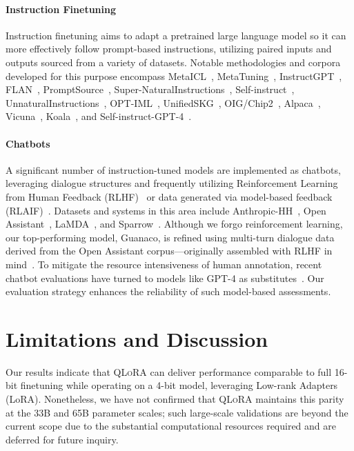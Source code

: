 \paragraph{Instruction Finetuning} Instruction finetuning aims to adapt a pretrained large language model so it can more effectively follow prompt-based instructions, utilizing paired inputs and outputs sourced from a variety of datasets. Notable methodologies and corpora developed for this purpose encompass MetaICL~\citep{min2021metaicl}, MetaTuning~\citep{zhong2021adapting}, InstructGPT~\citep{ouyang2022training}, FLAN~\citep{wei2021finetuned,chung2022scaling}, PromptSource~\citep{bach2022promptsource}, Super-NaturalInstructions~\citep{wang2022super,sanh2021multitask}, Self-instruct~\citep{wang2022self}, UnnaturalInstructions~\citep{honovich2022unnatural}, OPT-IML~\citep{iyer2022opt}, UnifiedSKG~\citep{xie2022unifiedskg}, OIG/Chip2~\citep{laion2023}, Alpaca~\citep{alpaca}, Vicuna~\citep{vicuna2023}, Koala~\citep{koala_blogpost_2023}, and Self-instruct-GPT-4~\citep{peng2023instruction}.

\paragraph{Chatbots} A significant number of instruction-tuned models are implemented as chatbots, leveraging dialogue structures and frequently utilizing Reinforcement Learning from Human Feedback (RLHF)~\citep{christiano2017deep} or data generated via model-based feedback (RLAIF)~\citep{bai2022constitutional}. Datasets and systems in this area include Anthropic-HH~\citep{askell2021general,bai2022training}, Open Assistant~\citep{kopf2023openassistant}, LaMDA~\citep{thoppilan2022lamda}, and Sparrow~\citep{glaese2022improving}. Although we forgo reinforcement learning, our top-performing model, Guanaco, is refined using multi-turn dialogue data derived from the Open Assistant corpus—originally assembled with RLHF in mind~\citep{kopf2023openassistant}. To mitigate the resource intensiveness of human annotation, recent chatbot evaluations have turned to models like GPT-4 as substitutes~\citep{vicuna2023,peng2023instruction}. Our evaluation strategy enhances the reliability of such model-based assessments.

\section{Limitations and Discussion}

Our results indicate that \textsc{QLoRA} can deliver performance comparable to full 16-bit finetuning while operating on a 4-bit model, leveraging Low-rank Adapters (LoRA). Nonetheless, we have not confirmed that \textsc{QLoRA} maintains this parity at the 33B and 65B parameter scales; such large-scale validations are beyond the current scope due to the substantial computational resources required and are deferred for future inquiry.

